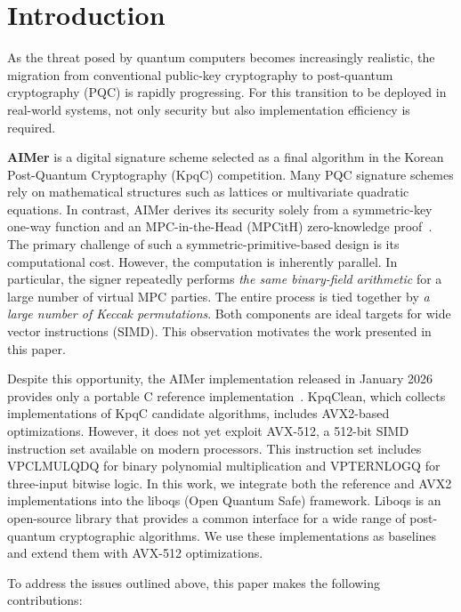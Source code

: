 \section{Introduction}
\label{sec:introduction}

As the threat posed by quantum computers becomes increasingly realistic, the migration from conventional public-key cryptography to post-quantum cryptography (PQC) is rapidly progressing. For this transition to be deployed in real-world systems, not only security but also implementation efficiency is required.

\textbf{AIMer} is a digital signature scheme selected as a final algorithm in the Korean Post-Quantum Cryptography (KpqC) competition. Many PQC signature schemes rely on mathematical structures such as lattices or multivariate quadratic equations. In contrast, AIMer derives its security solely from a symmetric-key one-way function and an MPC-in-the-Head (MPCitH) zero-knowledge proof~\cite{kim2023aimer}. The primary challenge of such a symmetric-primitive-based design is its computational cost. However, the computation is inherently parallel. In particular, the signer repeatedly performs \emph{the same binary-field arithmetic} for a large number of virtual MPC parties. The entire process is tied together by \emph{a large number of Keccak permutations}. Both components are ideal targets for wide vector instructions (SIMD). This observation motivates the work presented in this paper.

Despite this opportunity, the AIMer implementation released in January 2026 provides only a portable C reference implementation~\cite{choaimer}. KpqClean, which collects implementations of KpqC candidate algorithms, includes AVX2-based optimizations. However, it does not yet exploit AVX-512, a 512-bit SIMD instruction set available on modern processors. This instruction set includes VPCLMULQDQ for binary polynomial multiplication and VPTERNLOGQ for three-input bitwise logic. In this work, we integrate both the reference and AVX2 implementations into the liboqs (Open Quantum Safe) framework. Liboqs is an open-source library that provides a common interface for a wide range of post-quantum cryptographic algorithms. We use these implementations as baselines and extend them with AVX-512 optimizations.

To address the issues outlined above, this paper makes the following contributions:

